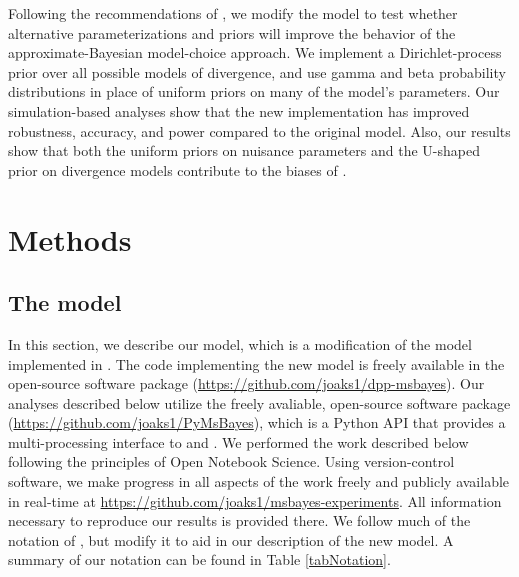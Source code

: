 Following the recommendations of \citet{Oaks2012}, we modify the \msb model to
test whether alternative parameterizations and priors will improve the behavior
of the approximate-Bayesian model-choice approach.
We implement a Dirichlet-process prior over all possible models of divergence,
and use gamma and beta probability distributions in place of uniform priors on
many of the model's parameters.
Our simulation-based analyses show that the new implementation has improved
robustness, accuracy, and power compared to the original model.
Also, our results show that both the uniform priors on nuisance parameters and
the U-shaped prior on divergence models contribute to the biases of \msb.


\section*{Methods}

\subsection*{The model}
In this section, we describe our model, which is a modification of the model
implemented in \msb \citep{Huang2011,Oaks2012}.
The code implementing the new model is freely available in the open-source
software package \dppmsbayes
(\href{https://github.com/joaks1/dpp-msbayes}{https://github.com/joaks1/dpp-msbayes}).
Our analyses described below utilize the freely avaliable, open-source software
package \pymsbayes (\href{https://github.com/joaks1/PyMsBayes}{https://github.com/joaks1/PyMsBayes}),
which is a Python API that provides a multi-processing interface to \msb and
\dppmsbayes.
We performed the work described below following the principles of
Open Notebook Science.
Using version-control software, we make progress in all aspects of the work
freely and publicly available in real-time at
\href{https://github.com/joaks1/msbayes-experiments}{https://github.com/joaks1/msbayes-experiments}.
All information necessary to reproduce our results is provided there.
We follow much of the notation of \citet{Oaks2012}, but modify it to
aid in our description of the new model.
A summary of our notation can be found in Table \ref{tabNotation}.

